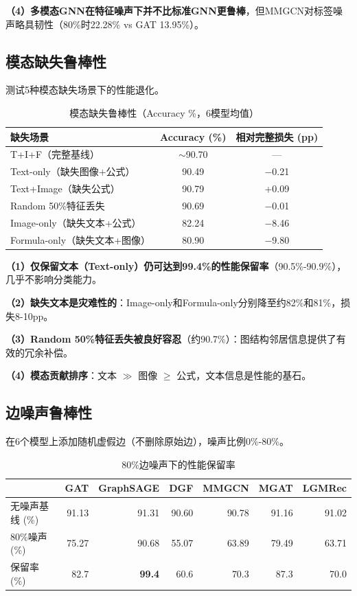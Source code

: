 \textbf{（4）多模态GNN在特征噪声下并不比标准GNN更鲁棒}，但MMGCN对标签噪声略具韧性（80\%时22.28\% vs GAT 13.95\%）。

\subsection{模态缺失鲁棒性}

测试5种模态缺失场景下的性能退化。

\begin{table}[htbp]
  \centering
  \caption{模态缺失鲁棒性（Accuracy \%，6模型均值）}
  \label{tab:modality_missing}
  \begin{tabular}{lcc}
    \toprule
    缺失场景 & Accuracy (\%) & 相对完整损失 (pp) \\
    \midrule
    T+I+F（完整基线） & $\sim$90.70 & --- \\
    Text-only（缺失图像+公式） & 90.49 & $-$0.21 \\
    Text+Image（缺失公式） & 90.79 & +0.09 \\
    Random 50\%特征丢失 & 90.69 & $-$0.01 \\
    Image-only（缺失文本+公式） & 82.24 & $-$8.46 \\
    Formula-only（缺失文本+图像） & 80.90 & $-$9.80 \\
    \bottomrule
  \end{tabular}
\end{table}

\textbf{（1）仅保留文本（Text-only）仍可达到99.4\%的性能保留率}（90.5\%-90.9\%），几乎不影响分类能力。

\textbf{（2）缺失文本是灾难性的}：Image-only和Formula-only分别降至约82\%和81\%，损失8-10pp。

\textbf{（3）Random 50\%特征丢失被良好容忍}（约90.7\%）：图结构邻居信息提供了有效的冗余补偿。

\textbf{（4）模态贡献排序}：文本 $\gg$ 图像 $\geq$ 公式，文本信息是性能的基石。

\subsection{边噪声鲁棒性}

在6个模型上添加随机虚假边（不删除原始边），噪声比例0\%-80\%。

\begin{table}[htbp]
  \centering
  \caption{80\%边噪声下的性能保留率}
  \label{tab:edge_noise}
  \begin{tabular}{lrrrrrr}
    \toprule
    & GAT & GraphSAGE & DGF & MMGCN & MGAT & LGMRec \\
    \midrule
    无噪声基线 (\%) & 91.13 & 91.31 & 90.60 & 90.78 & 91.16 & 91.02 \\
    80\%噪声 (\%) & 75.27 & 90.68 & 55.07 & 63.89 & 79.49 & 63.71 \\
    保留率 (\%) & 82.7 & \textbf{99.4} & 60.6 & 70.3 & 87.3 & 70.0 \\
    \bottomrule
  \end{tabular}
\end{table}

